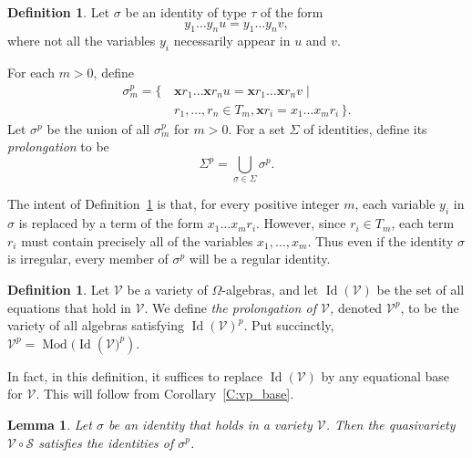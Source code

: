 \documentclass{birkau}
\newcommand{\mcV}{\mathcal{V}}
\newcommand{\mcS}{\mathcal{S}}
\newcommand{\bfx}{\mathbf x}
\newcommand{\pro}[1]{{#1}^p}
\theoremstyle{plain}
\newtheorem{lemma}[theorem]{Lemma}
\theoremstyle{definition}
\newtheorem{definition}[theorem]{Definition}
\numberwithin{equation}{section}
\begin{document}
\begin{definition}\label{D:eqbasprod}
Let $\sigma$ be an identity of type $\tau$ of the form
  \begin{equation*}
    y_1\ldots y_nu = y_1\ldots y_n v,
\end{equation*}
where not all the variables $y_i$ necessarily appear in $u$ and $v$.  

For each $m > 0$, define
\begin{align*}
    \sigma^{p}_m = \bigl\{\, &\bfx r_1\ldots \bfx r_n u = \bfx r_1\ldots \bfx r_n v \mid \\ &r_1,\dots, r_n \in T_m , \bfx r_i = x_1 \ldots x_m r_i
     \, \bigr\}.
\end{align*}
Let $\sigma^p$ be the union of all $\sigma^{p}_{m}$ for $m > 0$.   For a set $\Sigma$ of
identities, define its \emph{prolongation} to be 
\begin{equation*}
    \Sigma^p = \bigcup_{\sigma \in \Sigma} \sigma^p.
\end{equation*}
\end{definition}


The intent of Definition~\ref{D:eqbasprod} is that, for every positive integer $m$, each
variable $y_i$ in $\sigma$ is replaced by a term of the form $x_1\ldots x_m
r_i$. However, since $r_i \in T_m$, each term $r_i$ must contain precisely all of the
variables $x_1,\dots,x_m$. Thus even if the identity $\sigma$ is irregular, every member
of $\sigma^p$ will be a regular identity.

\begin{definition}
  Let $\mcV$ be a variety of $\Omega$-algebras, and let $\operatorname{Id}(\mcV)$ be the
  set of all equations that hold in $\mcV$. We define \emph{the prolongation of $\mcV$,}
  denoted $\pro{\mcV}$, to be the variety of all algebras satisfying
  $\pro{\operatorname{Id}(\mcV)}$. Put succinctly,
  $\pro{\mcV} = \operatorname{Mod}(\operatorname{Id}(\pro{\mcV)})$.
\end{definition}

In fact, in this definition, it suffices to replace $\operatorname{Id}(\mcV)$ by any
equational base for $\mcV$. This will follow from Corollary~\ref{C:vp_base}.

\begin{lemma}\label{L:VoS}
  Let $\sigma$ be an identity that holds in a variety $\mcV$. Then the quasivariety $\mcV
  \circ \mcS$ satisfies the identities of $\sigma^{p}$.
\end{lemma}
\end{document}
